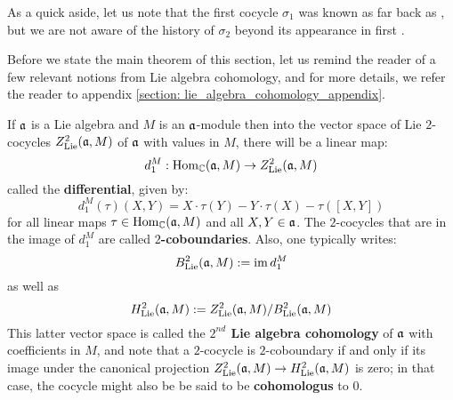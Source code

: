         As a quick aside, let us note that the first cocycle $\sigma_1$ was known as far back as \cite{moody_rao_yokonuma_vertex_representations_of_toroidal_lie_algebras}, but we are not aware of the history of $\sigma_2$ beyond its appearance in first \cite{billig_energy_momentum_tensor}.

        \begin{remark}
            Before we state the main theorem of this section, let us remind the reader of a few relevant notions from Lie algebra cohomology, and for more details, we refer the reader to appendix \ref{section: lie_algebra_cohomology_appendix}.
            
            If $\mathfrak{a}$ is a Lie algebra and $M$ is an $\mathfrak{a}$-module then into the vector space of Lie $2$-cocycles $Z^2_{\mathrm{Lie}}(\mathfrak{a}, M)$ of $\mathfrak{a}$ with values in $M$, there will be a linear map:
                $$d_1^M: \mathrm{Hom}_{\mathbb{C}}(\mathfrak{a}, M) \to Z^2_{\mathrm{Lie}}(\mathfrak{a}, M)$$
            called the \textbf{differential}, given by:
                $$d_1^M(\tau)(X, Y) = X \cdot \tau(Y) - Y \cdot \tau(X) - \tau([X, Y])$$
            for all linear maps $\tau \in \mathrm{Hom}_{\mathbb{C}}(\mathfrak{a}, M)$ and all $X, Y \in \mathfrak{a}$. The $2$-cocycles that are in the image of $d_1^M$ are called \textbf{$2$-coboundaries}. Also, one typically writes:
                $$B^2_{\mathrm{Lie}}(\mathfrak{a}, M) := \operatorname{im} d_1^M$$
            as well as
                $$H^2_{\mathrm{Lie}}(\mathfrak{a}, M) := Z^2_{\mathrm{Lie}}(\mathfrak{a}, M)/B^2_{\mathrm{Lie}}(\mathfrak{a}, M)$$
            This latter vector space is called the \textbf{$2^{nd}$ Lie algebra cohomology} of $\mathfrak{a}$ with coefficients in $M$, and note that a $2$-cocycle is $2$-coboundary if and only if its image under the canonical projection $Z^2_{\mathrm{Lie}}(\mathfrak{a}, M) \to H^2_{\mathrm{Lie}}(\mathfrak{a}, M)$ is zero; in that case, the cocycle might also be be said to be \textbf{cohomologus} to $0$.
        \end{remark}

